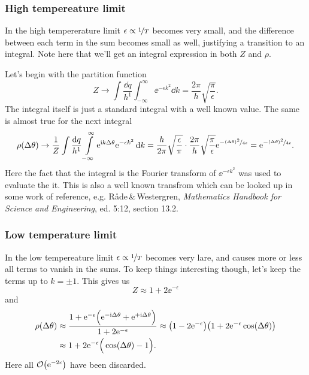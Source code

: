 \documentclass[11pt,letter, swedish, english
]{article}
\begin{document}
\subsubsection{High tempereature limit}
In the high tempererature limit $\epsilon\propto\nicefrac{1}{T}$
becomes very small, and the difference between each term in the sum
becomes small as well, justifying a transition to an integral. Note
here that we'll get an integral expression in both $Z$ and $\rho$.

Let's begin with the partition function
\begin{equation}
Z\to \int\frac{\dd{q}}{h^1}\int_{-\infty}^\infty\ee^{-\epsilon k^2} \dd{k} 
= \frac{2\pi}{h}\sqrt{\frac{\pi}{\epsilon}}.
\end{equation}
The integral itself is just a standard integral with a well known
value. The same is almost true for the next integral
\begin{equation}
\rho(\Delta\theta) \to \frac{1}{Z}
\int\frac{\dd{q}}{h^1}\int_{-\infty}^\infty\ee^{\ii k\Delta\theta}\ee^{-\epsilon k^2} \dd{k} 
= \frac{h}{2\pi}\sqrt{\frac{\epsilon}{\pi}}\cdot
\frac{2\pi}{h}\sqrt{\frac{\pi}{\epsilon}}\ee^{-\nicefrac{(\Delta\theta)^2}{4\epsilon}}
= \ee^{-\nicefrac{(\Delta\theta)^2}{4\epsilon}}.
\end{equation}
Here the fact that the integral is the Fourier transform of
$\ee^{-\epsilon k^2}$ was used to evaluate the it. This is also
a well known transfrom which can be looked up in some work of
reference, e.g. Råde\,\&\,Westergren, \textit{Mathematics Handbook for
Science and Engineering}, ed. 5:12, section 13.2.

\subsubsection{Low temperature limit}
In the low tempereature limit $\epsilon\propto\nicefrac{1}{T}$ becomes
very lare, and causes more or less all terms to vanish in the sums. To
keep things interesting though, let's keep the terms up to
$k=\pm1$. This gives us
\begin{equation}
Z\approx 1+2\ee^{-\epsilon}
\end{equation}
and
\begin{equation}
\begin{aligned}
\rho(\Delta\theta)&\approx 
\frac{1+\mathrm{e}^{-\epsilon}\Big(\mathrm{e}^{-\mathrm{i}\Delta\theta}+\mathrm{e}^{+\mathrm{i}\Delta\theta}\Big)}{1+2\mathrm{e}^{-\epsilon}}
\approx
\qty(1-2\mathrm{e}^{-\epsilon})\qty(1+2\mathrm{e}^{-\epsilon}\cos(\Delta\theta))\\
&\approx 1 + 2\mathrm{e}^{-\epsilon}\Big(\cos(\Delta\theta)-1\Big).
\end{aligned}
\end{equation}
Here all $\order{\ee^{-2\epsilon}}$ have been discarded.
\end{document}
